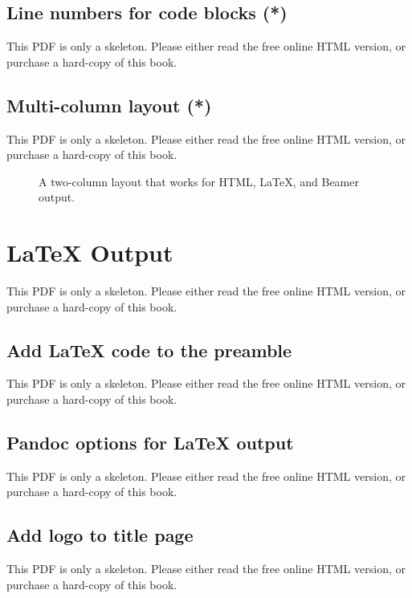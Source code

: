 \documentclass[
  11pt,
]{krantz}
\begin{document}
\section{Line numbers for code blocks (*)}\label{number-lines}

This PDF is only a skeleton. Please either read the free online HTML version, or purchase a hard-copy of this book.

\section{Multi-column layout (*)}\label{multi-column}

This PDF is only a skeleton. Please either read the free online HTML version, or purchase a hard-copy of this book.

\begin{figure}\caption{A two-column layout that works for HTML, LaTeX, and Beamer output.}\end{figure}

\chapter{LaTeX Output}\label{latex-output}

This PDF is only a skeleton. Please either read the free online HTML version, or purchase a hard-copy of this book.

\section{Add LaTeX code to the preamble}\label{latex-preamble}

This PDF is only a skeleton. Please either read the free online HTML version, or purchase a hard-copy of this book.

\section{Pandoc options for LaTeX output}\label{latex-variables}

This PDF is only a skeleton. Please either read the free online HTML version, or purchase a hard-copy of this book.

\section{Add logo to title page}\label{latex-logo}

This PDF is only a skeleton. Please either read the free online HTML version, or purchase a hard-copy of this book.
\end{document}
